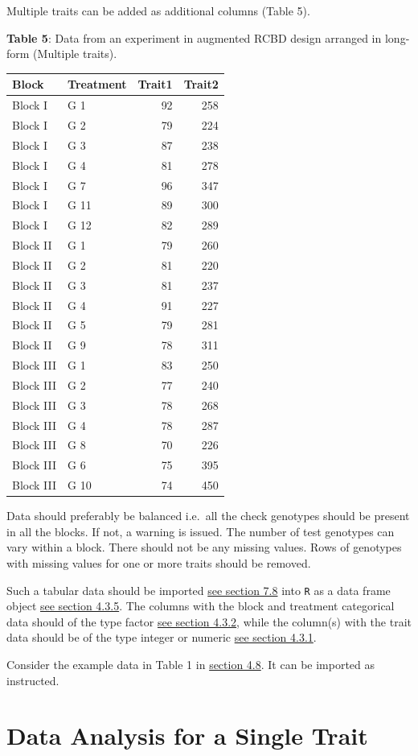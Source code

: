 Multiple traits can be added as additional columns (Table 5).

\begin{center}
                \textbf{Table 5}: Data from an experiment in augmented RCBD design arranged in long-form (Multiple traits).
                \end{center}

\begin{longtable}[]{@{}llrr@{}}
\toprule
Block & Treatment & Trait1 & Trait2\tabularnewline
\midrule
\endhead
Block I & G 1 & 92 & 258\tabularnewline
Block I & G 2 & 79 & 224\tabularnewline
Block I & G 3 & 87 & 238\tabularnewline
Block I & G 4 & 81 & 278\tabularnewline
Block I & G 7 & 96 & 347\tabularnewline
Block I & G 11 & 89 & 300\tabularnewline
Block I & G 12 & 82 & 289\tabularnewline
Block II & G 1 & 79 & 260\tabularnewline
Block II & G 2 & 81 & 220\tabularnewline
Block II & G 3 & 81 & 237\tabularnewline
Block II & G 4 & 91 & 227\tabularnewline
Block II & G 5 & 79 & 281\tabularnewline
Block II & G 9 & 78 & 311\tabularnewline
Block III & G 1 & 83 & 250\tabularnewline
Block III & G 2 & 77 & 240\tabularnewline
Block III & G 3 & 78 & 268\tabularnewline
Block III & G 4 & 78 & 287\tabularnewline
Block III & G 8 & 70 & 226\tabularnewline
Block III & G 6 & 75 & 395\tabularnewline
Block III & G 10 & 74 & 450\tabularnewline
\bottomrule
\end{longtable}

Data should preferably be balanced i.e.~all the check genotypes should
be present in all the blocks. If not, a warning is issued. The number of
test genotypes can vary within a block. There should not be any missing
values. Rows of genotypes with missing values for one or more traits
should be removed.

Such a tabular data should be imported \protect\hyperlink{impexp}{see
section 7.8} into \texttt{R} as a data frame object
\protect\hyperlink{dataframe}{see section 4.3.5}. The columns with the
block and treatment categorical data should of the type factor
\protect\hyperlink{factor}{see section 4.3.2}, while the column(s) with
the trait data should be of the type integer or numeric
\protect\hyperlink{vector}{see section 4.3.1}.

Consider the example data in Table 1 in
\protect\hyperlink{impexp}{section 4.8}. It can be imported as
instructed.

\hypertarget{data-analysis-for-a-single-trait}{%
\section{Data Analysis for a Single
Trait}\label{data-analysis-for-a-single-trait}}

